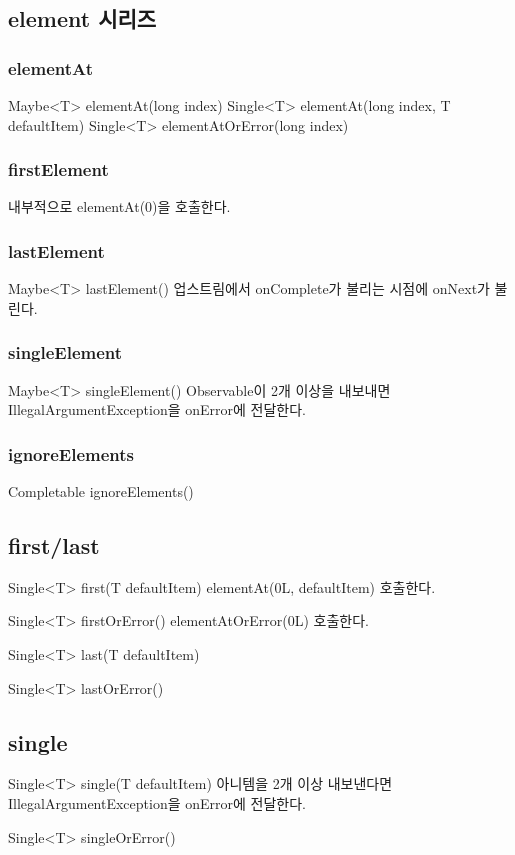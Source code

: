 \documentclass{book}
\begin{document}
{\subsection{element 시리즈}
\subsubsection{elementAt}
Maybe<T> elementAt(long index)
Single<T> elementAt(long index, T defaultItem)
Single<T> elementAtOrError(long index)

\subsubsection{firstElement}
내부적으로 elementAt(0)을 호출한다. 

\subsubsection{lastElement}
Maybe<T> lastElement()
업스트림에서 onComplete가 불리는 시점에 onNext가 불린다. 

\subsubsection{singleElement}
Maybe<T> singleElement()
Observable이 2개 이상을 내보내면 IllegalArgumentException을 onError에 전달한다.

\subsubsection{ignoreElements}
Completable ignoreElements()

\subsection{first/last}
Single<T> first(T defaultItem) 
elementAt(0L, defaultItem) 호출한다.

Single<T> firstOrError()
elementAtOrError(0L) 호출한다.

Single<T> last(T defaultItem)

Single<T> lastOrError()

\subsection{single}
Single<T> single(T defaultItem)
아니템을 2개 이상 내보낸다면 IllegalArgumentException을 onError에 전달한다.

Single<T> singleOrError()

}
\end{document}
